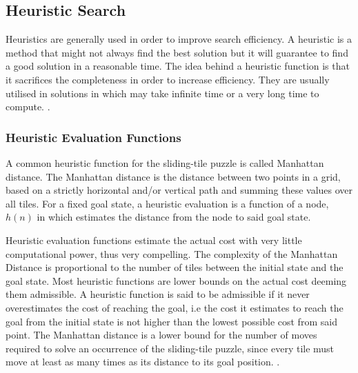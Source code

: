 \documentclass[review]{cmpreport}
\begin{document}
\subsection{Heuristic Search} \label{sec1}
Heuristics are generally used in order to improve search efficiency. A heuristic is a method that might not always find the best solution but it will guarantee to find a good solution in a reasonable time. The idea behind a heuristic function is that it sacrifices the completeness in order to increase efficiency. They are usually utilised in solutions in which may take infinite time or a very long time to compute. \citep{DBLP:conf/ai/2014}.

\subsubsection{Heuristic Evaluation Functions}
A common heuristic function for the sliding-tile puzzle is called Manhattan distance. The Manhattan distance is the distance between two points in a grid, based on a strictly horizontal and/or vertical path and summing these values over all tiles. For a fixed goal state, a heuristic evaluation is a function of a node, $h(n)$ in which estimates the distance from the node to said goal state.


Heuristic evaluation functions estimate the actual cost with very little computational power, thus very compelling. The complexity of the Manhattan Distance is proportional to the number of tiles between the initial state and the goal state. Most heuristic functions are lower bounds on the actual cost deeming them admissible. A heuristic function is said to be admissible if it never overestimates the cost of reaching the goal, i.e the cost it estimates to reach the goal from the initial state is not higher than the lowest possible cost from said point. The Manhattan distance is a lower bound for the number of moves required to solve an occurrence of the sliding-tile puzzle, since every tile must move at least as many times as its distance to its goal position. \citep{DBLP:conf/ccgrid/LinnertSB14}.
\end{document}
